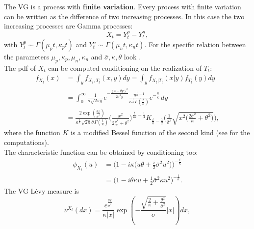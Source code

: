 The VG is a process with \textbf{finite variation}. Every process with finite variation can be written as the difference of two increasing 
processes. In this case the two increasing processes are Gamma processes:
\begin{equation}
 X_t = Y^p_t - Y^n_t,
\end{equation}
with $Y^p_t \sim \Gamma(\mu_p t, \kappa_p t)$ and $Y^n_t \sim \Gamma(\mu_n t, \kappa_n t)$. For the specific relation between the parameters
$\mu_p,\kappa_p,\mu_n,\kappa_n$ and $\bar\sigma,\kappa,\theta$ look \cite{MCC98}.\\
\newline
The pdf of $X_t$ can be computed conditioning on the realization of $T_t$:
\begin{align}\label{VG_density}
 f_{X_t}(x) &= \int_y f_{X_t,T_t}(x,y) dy = \int_y f_{X_t|T_t}(x|y) f_{T_t}(y) dy \\ \nonumber
         &= \int_0^{\infty} \frac{1}{\bar\sigma \sqrt{2\pi y}} e^{-\frac{(x -\theta y)^2}{2\bar\sigma^2 y}}
         \frac{y^{\frac{t}{\kappa} -1}}{\kappa^{\frac{t}{\kappa}} \Gamma(\frac{t}{\kappa})}
          e^{-\frac{y}{\kappa}} \, dy \\ \nonumber
         &= \frac{2 \exp(\frac{\theta x}{\bar\sigma^2})}{\kappa^{\frac{t}{\kappa}} \sqrt{2\pi}\bar\sigma \Gamma(\frac{t}{\kappa}) }
            \biggl( \frac{x^2}{2\frac{\bar\sigma^2}{\kappa} + \theta^2} \biggr)^{\frac{t}{2\kappa}-\frac{1}{4}} 
            K_{\frac{t}{\kappa}-\frac{1}{2}} 
            \biggl( \frac{1}{\bar\sigma^2} \sqrt{x^2 \bigl(\frac{2\bar\sigma^2}{\kappa}+\theta^2 \bigr)} \biggr),
\end{align}
where the function $K$ is a modified Bessel function of the second kind (see \cite{MCC98} for the computations).\\
The characteristic function can be obtained by conditioning too: 
\begin{align*}
 \phi_{X_t}(u) &= \biggl( 1-i \kappa \bigl( u\theta +\frac{i}{2}\bar\sigma^2 u^2 \bigr) \biggr)^{-\frac{t}{\kappa}} \\  
	       &= \biggl( 1-i\theta \kappa u + \frac{1}{2} \bar\sigma^2 \kappa u^2 \biggr)^{-\frac{t}{\kappa}}.
\end{align*}
\newline
The VG Lévy measure is
\begin{equation}\label{VG_measure}
 \nu^{X_t}(dx) = \frac{e^{\frac{\theta x}{\bar\sigma^2}}}{\kappa|x|} \exp 
 \left( - \frac{\sqrt{\frac{2}{\kappa} + \frac{\theta^2}{\bar\sigma^2}}}{\bar\sigma} |x|\right) dx,
\end{equation}
